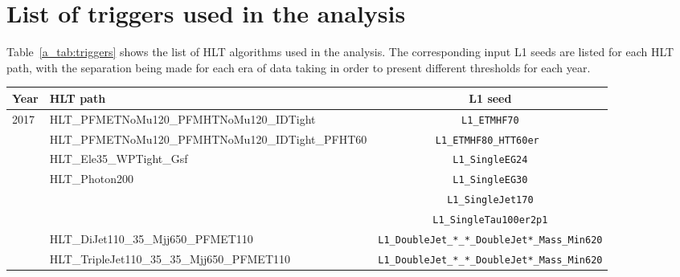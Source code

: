 \section{List of triggers used in the analysis}
\label{app:trigger_list}
\hspace{10pt} Table~\ref{a_tab:triggers} shows the list of HLT algorithms used in the analysis. The corresponding input L1 seeds are listed for each HLT path, with the separation being made for each era of data taking in order to present different thresholds for each year.

\begin{table}[htbp]

    \centering
     \def\arraystretch{1.5}

    \tiny

    \begin{tabular}{l l c}
        \hline\hline
        Year                   & HLT path                                                  & L1 seed                                 \\\hline\hline
        \multirow{8}{*}{2017}  & HLT\_PFMETNoMu120\_PFMHTNoMu120\_IDTight                  & \texttt{L1\_ETMHF70}                     \\
                               & HLT\_PFMETNoMu120\_PFMHTNoMu120\_IDTight\_PFHT60          & \texttt{L1\_ETMHF80\_HTT60er }                      \\\cline{2-3}
                               & HLT\_Ele35\_WPTight\_Gsf                                  & \texttt{L1\_SingleEG24}                     \\\cline{2-3}
                               & \multirow{3}{*}{HLT\_Photon200}                           & \texttt{L1\_SingleEG30}         \\
                               &                                                           & \texttt{L1\_SingleJet170}        \\
                               &                                                           & \texttt{L1\_SingleTau100er2p1}                  \\\cline{2-3}
                               & HLT\_DiJet110\_35\_Mjj650\_PFMET110                       & \texttt{L1\_DoubleJet\_*\_*\_DoubleJet*\_Mass\_Min620}             \\\cline{2-3}
                               & HLT\_TripleJet110\_35\_35\_Mjj650\_PFMET110               & \texttt{L1\_DoubleJet\_*\_*\_DoubleJet*\_Mass\_Min620}     
                               \\\hline\hline


\end{tabular}
\end{table}

